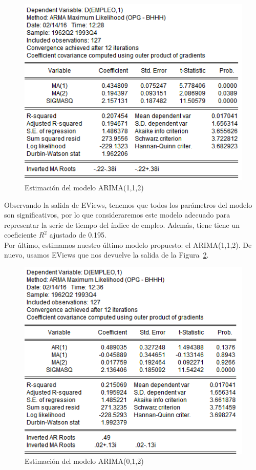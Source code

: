 \documentclass[12pt,a4paper,twoside,openright,titlepage,final]{article}
\begin{document}
\begin{figure}[tbph!]
	\centering
	\includegraphics[width=0.7\linewidth]{imagenes/empleo/modelo2-estadisticas.png}
	\caption{Estimación del modelo ARIMA(1,1,2)}
	\label{fig:modelo2-estadisticas}
\end{figure}

Observando la salida de EViews, tenemos que todos los parámetros del modelo son significativos, por lo que consideraremos este modelo adecuado para representar la serie de tiempo del índice de empleo. Además, tiene tiene un coeficiente $R^2$ ajustado de 0.195.\\

Por último, estimamos nuestro último modelo propuesto: el ARIMA(1,1,2). De nuevo, usamos EViews que nos devuelve la salida de la Figura~\ref{fig:modelo3-estadisticas}.\\

\begin{figure}[tbph!]
	\centering
	\includegraphics[width=0.7\linewidth]{imagenes/empleo/modelo3-estadisticas.png}
	\caption{Estimación del modelo ARIMA(0,1,2)}
	\label{fig:modelo3-estadisticas}
\end{figure}
\end{document}
